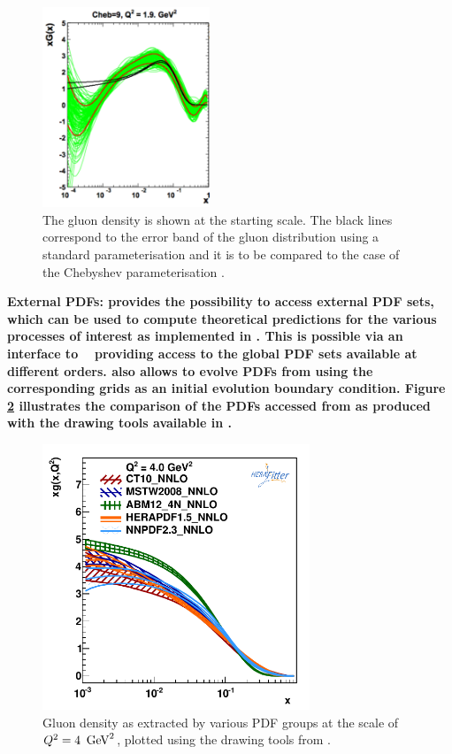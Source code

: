 \begin{description}
\begin{figure}[!ht]
 \centering
  \includegraphics[width=5cm]{chebishev.pdf}
  \caption{The gluon density is shown at the starting scale. The black lines correspond to the error band of the gluon distribution using a standard parameterisation and it is to be compared to the case of the Chebyshev parameterisation \cite{Chebyshev}.}
 \label{fig:cheb}
\end{figure}

%
\item \bf{External PDFs:} \rm 
 \fitter provides the possibility to access external PDF sets, which can be used to compute 
theoretical predictions for the various processes of interest as implemented in \fitter. 
This is possible via an interface to \lhapdf~\cite{lhapdf,lhapdfweb} providing access to the 
global PDF sets available at different orders.
\fitter also allows to evolve PDFs from \lhapdf using the corresponding grids as an initial evolution boundary condition.
Figure \ref{fig:pdfs} illustrates the comparison of the PDFs accessed from \lhapdf as produced with the drawing 
tools available in \fitter.
\end{description}
%
\begin{figure}[!ht]
   \centering
   \includegraphics[width=8cm]{pdfs.pdf}
   \caption{Gluon density as extracted by various PDF groups at the scale of $Q^2=4 \ \,\text{Ge\hspace{-.08em}V}^2$, plotted using the drawing tools from \fitter.} 
 \label{fig:pdfs}
\end{figure}
%
